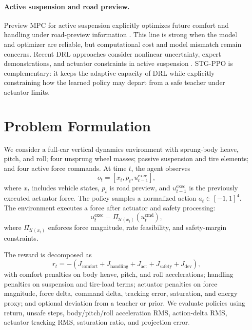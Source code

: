 \documentclass[letterpaper,twocolumn]{article}
\begin{document}
\paragraph{Active suspension and road preview.}
Preview MPC for active suspension explicitly optimizes future comfort and handling under road-preview information \citep{papadimitrakis2022preview_mpc,li2024speed_preview_mpc}.
This line is strong when the model and optimizer are reliable, but computational cost and model mismatch remain concerns.
Recent DRL approaches consider nonlinear uncertainty, expert demonstrations, and actuator constraints in active suspension \citep{tan2024active_demo}.
STG-PPO is complementary: it keeps the adaptive capacity of DRL while explicitly constraining how the learned policy may depart from a safe teacher under actuator limits.

\section{Problem Formulation}

We consider a full-car vertical dynamics environment with sprung-body heave, pitch, and roll; four unsprung wheel masses; passive suspension and tire elements; and four active force commands.
At time $t$, the agent observes
\begin{equation}
    o_t = [x_t, p_t, u^{\mathrm{exec}}_{t-1}],
\end{equation}
where $x_t$ includes vehicle states, $p_t$ is road preview, and $u^{\mathrm{exec}}_{t-1}$ is the previously executed actuator force.
The policy samples a normalized action $a_t \in [-1,1]^4$.
The environment executes a force after actuator and safety processing:
\begin{equation}
    u^{\mathrm{exec}}_t = \Pi_{\mathcal{U}(x_t)}(u^{\mathrm{cmd}}_t),
\end{equation}
where $\Pi_{\mathcal{U}(x_t)}$ enforces force magnitude, rate feasibility, and safety-margin constraints.

The reward is decomposed as
\begin{equation}
r_t = -(J_{\mathrm{comfort}} + J_{\mathrm{handling}} + J_{\mathrm{act}} + J_{\mathrm{safety}} + J_{\mathrm{dev}}),
\end{equation}
with comfort penalties on body heave, pitch, and roll accelerations; handling penalties on suspension and tire-load terms; actuator penalties on force magnitude, force delta, command delta, tracking error, saturation, and energy proxy; and optional deviation from a teacher or prior.
We evaluate policies using return, unsafe steps, body/pitch/roll acceleration RMS, action-delta RMS, actuator tracking RMS, saturation ratio, and projection error.
\end{document}
